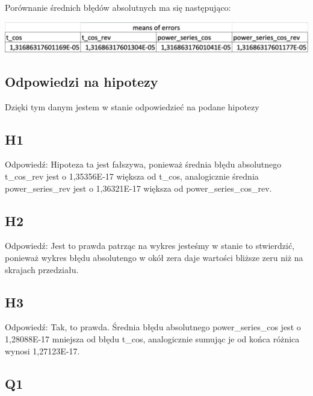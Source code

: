 \documentclass{article}
\begin{document}
\clearpage

Porównanie średnich błędów absolutnych ma się następująco:

\hspace{0.5cm}

\centerline{\includegraphics[scale=0.3]{means.png}}

\subsection{Odpowiedzi na hipotezy}

Dzięki tym danym jestem w stanie odpowiedzieć na podane hipotezy

\subsection{H1}

Odpowiedź: Hipoteza ta jest fałszywa, ponieważ średnia błędu absolutnego t\_cos\_rev jest o 1,35356E-17 większa od t\_cos, analogicznie średnia power\_series\_rev jest o 1,36321E-17 większa od power\_series\_cos\_rev.

\subsection{H2}

Odpowiedź: Jest to prawda patrząc na wykres jesteśmy w stanie to stwierdzić, ponieważ wykres błędu absolutengo w okół zera daje wartości bliższe zeru niż na skrajach przedziału.

\subsection{H3}

Odpowiedź: Tak, to prawda. Średnia błędu absolutnego power\_series\_cos jest o 1,28088E-17 mniejsza od błędu t\_cos, analogicznie sumując je od końca różnica wynosi 1,27123E-17.

\subsection{Q1}
\end{document}
